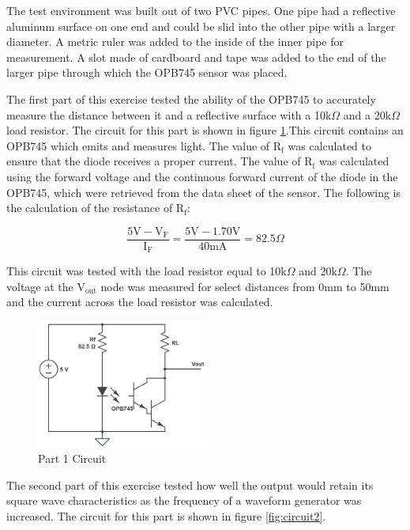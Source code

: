 \documentclass[CMPE]{KGCOEReport}
\begin{document}
The test environment was built out of two PVC pipes. One pipe had a reflective aluminum surface on one end and could be slid into the other pipe with a larger diameter. A metric ruler was added to the inside of the inner pipe for measurement. A slot made of cardboard and tape was added to the end of the larger pipe through which the OPB745 sensor was placed.

The first part of this exercise tested the ability of the OPB745 to accurately measure the distance between it and a reflective surface with a 10k$\Omega$ and a 20k$\Omega$ load resistor. The circuit for this part is shown in figure \ref{fig:circuit1}.This circuit contains an OPB745 which emits and measures light. The value of R$_\text{f}$ was calculated to ensure that the diode receives a proper current. The value of R$_\text{f}$ was calculated using the forward voltage and the continuous forward current of the diode in the OPB745, which were retrieved from the data sheet of the sensor. The following is the calculation of the resistance of R$_\text{f}$:

\[ \frac{5\text{V} - \text{V}_\text{F}}{\text{I}_\text{F}} = \frac{5\text{V} - 1.70\text{V}}{40 \text{mA}} = 82.5 \Omega \]

This circuit was tested with the load resistor equal to 10k$\Omega$ and 20k$\Omega$. The voltage at the V$_{\text{out}}$ node was measured for select distances from 0mm to 50mm and the current across the load resistor was calculated.

\begin{figure}[H]
    \centering
    \includegraphics[width=0.5\textwidth]{circuit_1.png}
    \caption{Part 1 Circuit}
    \label{fig:circuit1}
\end{figure}

The second part of this exercise tested how well the output would retain its square wave characteristics as the frequency of a waveform generator was increased. The circuit for this part is shown in figure \ref{fig:circuit2}.
\end{document}
